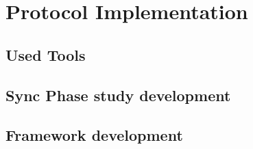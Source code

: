 \chapter{Protocol Implementation}
\label{chap:protocolimplementation}

\section{Used Tools}

\section{Sync Phase study development}

\section{Framework development}
